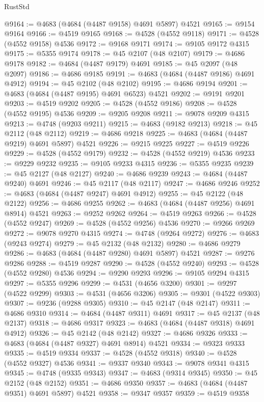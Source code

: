 \begin{lexlean}{RustStd}
\begin{coremodule}
@9164 := @4683 (@4684 (@4487 @9158) @4691 @5897) @4521
@9165 := @9154 @9164
@9166 := @4519 @9165
@9168 := @4528 (@4552 @9118)
@9171 := @4528 (@4552 @9158) @4536
@9172 := @9168 @9171
@9174 := @9105 @9172 @4315
@9175 := @5355 @9174
@9178 := @45 @2107 (@48 @2107)
@9179 := @4686 @9178
@9182 := @4684 (@4487 @9179) @4691
@9185 := @45 @2097 (@48 @2097)
@9186 := @4686 @9185
@9191 := @4683 (@4684 (@4487 @9186) @4691 @4912)
@9194 := @45 @2102 (@48 @2102)
@9195 := @4686 @9194
@9201 := @4683 (@4684 (@4487 @9195) @4691 @6523) @4521
@9202 := @9191 @9201
@9203 := @4519 @9202
@9205 := @4528 (@4552 @9186)
@9208 := @4528 (@4552 @9195) @4536
@9209 := @9205 @9208
@9211 := @9078 @9209 @4315
@9213 := @4748 (@9203 @9211)
@9215 := @4683 (@9182 @9213)
@9218 := @45 @2112 (@48 @2112)
@9219 := @4686 @9218
@9225 := @4683 (@4684 (@4487 @9219) @4691 @5897) @4521
@9226 := @9215 @9225
@9227 := @4519 @9226
@9229 := @4528 (@4552 @9179)
@9232 := @4528 (@4552 @9219) @4536
@9233 := @9229 @9232
@9235 := @9105 @9233 @4315
@9236 := @5355 @9235
@9239 := @45 @2127 (@48 @2127)
@9240 := @4686 @9239
@9243 := @4684 (@4487 @9240) @4691
@9246 := @45 @2117 (@48 @2117)
@9247 := @4686 @9246
@9252 := @4683 (@4684 (@4487 @9247) @4691 @4912)
@9255 := @45 @2122 (@48 @2122)
@9256 := @4686 @9255
@9262 := @4683 (@4684 (@4487 @9256) @4691 @8914) @4521
@9263 := @9252 @9262
@9264 := @4519 @9263
@9266 := @4528 (@4552 @9247)
@9269 := @4528 (@4552 @9256) @4536
@9270 := @9266 @9269
@9272 := @9078 @9270 @4315
@9274 := @4748 (@9264 @9272)
@9276 := @4683 (@9243 @9274)
@9279 := @45 @2132 (@48 @2132)
@9280 := @4686 @9279
@9286 := @4683 (@4684 (@4487 @9280) @4691 @5897) @4521
@9287 := @9276 @9286
@9288 := @4519 @9287
@9290 := @4528 (@4552 @9240)
@9293 := @4528 (@4552 @9280) @4536
@9294 := @9290 @9293
@9296 := @9105 @9294 @4315
@9297 := @5355 @9296
@9299 := @4531 (@4656 @3200)
@9301 := @9297 (@4522 @9299)
@9303 := @4531 (@4656 @3206)
@9305 := @9301 (@4522 @9303)
@9307 := @9236 (@9288 @9305)
@9310 := @45 @2147 (@48 @2147)
@9311 := @4686 @9310
@9314 := @4684 (@4487 @9311) @4691
@9317 := @45 @2137 (@48 @2137)
@9318 := @4686 @9317
@9323 := @4683 (@4684 (@4487 @9318) @4691 @4912)
@9326 := @45 @2142 (@48 @2142)
@9327 := @4686 @9326
@9333 := @4683 (@4684 (@4487 @9327) @4691 @8914) @4521
@9334 := @9323 @9333
@9335 := @4519 @9334
@9337 := @4528 (@4552 @9318)
@9340 := @4528 (@4552 @9327) @4536
@9341 := @9337 @9340
@9343 := @9078 @9341 @4315
@9345 := @4748 (@9335 @9343)
@9347 := @4683 (@9314 @9345)
@9350 := @45 @2152 (@48 @2152)
@9351 := @4686 @9350
@9357 := @4683 (@4684 (@4487 @9351) @4691 @5897) @4521
@9358 := @9347 @9357
@9359 := @4519 @9358

\end{coremodule}
\end{lexlean}
